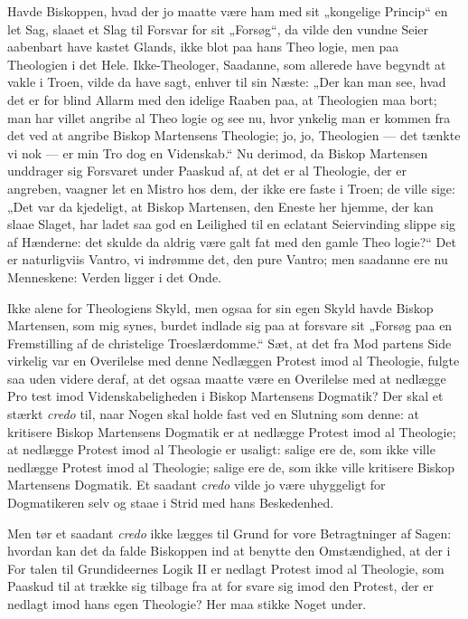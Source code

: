 \documentclass[12pt]{book}
\newcommand{\opage}[1]{\marginnote{\footnotesize\textit{[#1]}}}
\begin{document}
Havde Biskoppen, hvad der jo maatte være ham med
sit „kongelige Princip“ en let Sag, slaaet et Slag til
Forsvar for sit „Forsøg“, da vilde den vundne Seier
aabenbart have kastet Glands, ikke blot paa hans Theo\-%
logie, men paa Theologien i det Hele. Ikke-Theologer,
Saadanne, som allerede have begyndt at vakle i Troen,
vilde da have sagt, enhver til sin Næste: „Der kan man see,
hvad det er for blind Allarm med den idelige Raaben paa,
at Theologien maa bort; man har villet angribe al Theo\-%
logie og see nu, hvor ynkelig man er kommen fra det ved at
angribe Biskop Martensens Theologie; jo, jo, Theologien ---
det tænkte vi nok --- er min Tro dog en Videnskab.“ Nu
derimod, da Biskop Martensen unddrager sig Forsvaret under
\opage{80}\setcounter{footnote}{0}%
Paaskud af, at det er al Theologie, der er angreben, vaagner
let en Mistro hos dem, der ikke ere faste i Troen; de ville
sige: „Det var da kjedeligt, at Biskop Martensen, den Eneste
her hjemme, der kan slaae Slaget, har ladet saa god en
Leilighed til en eclatant Seiervinding slippe sig af Hænderne:
det skulde da aldrig være galt fat med den gamle Theo\-%
logie?“ Det er naturligviis Vantro, vi indrømme det, den
pure Vantro; men saadanne ere nu Menneskene: Verden
ligger i det Onde.

Ikke alene for Theologiens Skyld, men ogsaa for sin
egen Skyld havde Biskop Martensen, som mig synes, burdet
indlade sig paa at forsvare sit „Forsøg paa en Fremstilling
af de christelige Troeslærdomme.“ Sæt, at det fra Mod\-%
partens Side virkelig var en Overilelse med denne Nedlæggen
Protest imod al Theologie, fulgte saa uden videre deraf, at
det ogsaa maatte være en Overilelse med at nedlægge Pro\-%
test imod Videnskabeligheden i Biskop Martensens Dogmatik?
Der skal et stærkt \textit{credo} til, naar Nogen skal holde fast ved
en Slutning som denne: at kritisere Biskop Martensens
Dogmatik er at nedlægge Protest imod al Theologie; at
nedlægge Protest imod al Theologie er usaligt: salige ere de,
som ikke ville nedlægge Protest imod al Theologie; salige ere
de, som ikke ville kritisere Biskop Martensens Dogmatik.
Et saadant \textit{credo} vilde jo være uhyggeligt for Dogmatikeren
selv og staae i Strid med hans Beskedenhed.

Men tør et saadant \textit{credo} ikke lægges til Grund for
vore Betragtninger af Sagen: hvordan kan det da falde
Biskoppen ind at benytte den Omstændighed, at der i For\-%
talen til Grundideernes Logik II er nedlagt Protest imod al
Theologie, som Paaskud til at trække sig tilbage fra at for\-%
svare sig imod den Protest, der er nedlagt imod hans egen
Theologie? Her maa stikke Noget under.
\end{document}
